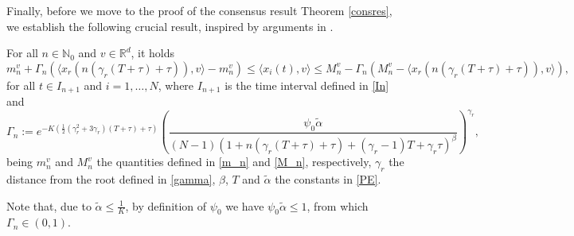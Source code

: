 \documentclass[11pt]{article}
\begin{document}
Finally, before we move to the proof of the consensus result Theorem \ref{consres}, we establish the following crucial result, inspired by arguments in \cite{CCP,H3}.
	\begin{prop}\label{lemma3onoff}
		For all $n\in \mathbb{N}_0$ and $v\in \mathbb{R}^d$, it holds
		\begin{equation} \label{Bonoff}
			m_{n}^v+\Gamma_n(\langle x_r(n(\gamma_r(T+\tau)+\tau)),v \rangle-m^v_{n}) \leq \langle x_i(t),v\rangle\leq M^v_{n}-\Gamma_n(M^v_{n}-\langle x_r(n(\gamma_r(T+\tau)+\tau)),v \rangle), 
		\end{equation}
		for all $t\in I_{n+1}$ and $i =1,\dots, N$, where $I_{n+1}$ is the time interval defined in \eqref{In} and		\begin{equation}\label{Gammaonoff}
			\Gamma_n:=e^{-K (\frac{1}{2}(\gamma_{r}^2+3\gamma_r)(T+\tau)+\tau)}\left(\frac{\psi_{0}\tilde{\alpha}}{(N-1)(1+n(\gamma_r(T+\tau)+\tau)+(\gamma_r-1)T+\gamma_r\tau)^\beta}\right)^{\gamma_r},
		\end{equation}
		being $m_n^v$ and $M_n^v$ the quantities defined in \eqref{m_n} and \eqref{M_n}, respectively, $\gamma_r$ the distance from the root defined in \eqref{gamma}, $\beta$, $T$ and $\tilde{\alpha}$ the constants in \eqref{PE}.
	\end{prop}
	\begin{oss}
		Note that, due to $\tilde{\alpha}\leq \frac{1}{K}$, by definition of $\psi_{0}$ we have $\psi_{0}\tilde{\alpha}\leq 1$, from which $\Gamma_n\in (0,1)$.
	\end{oss}
\end{document}
